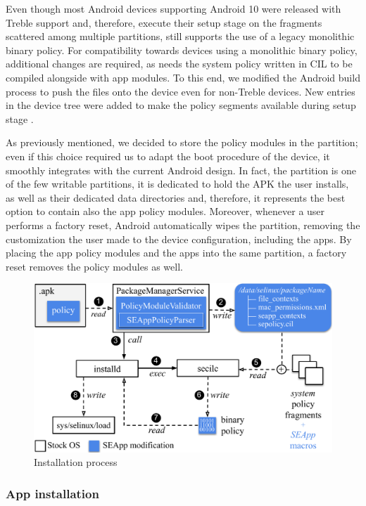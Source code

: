 Even though most Android devices supporting Android 10 were released
with Treble support and, therefore, execute their \sel setup stage on
the \sepolicy fragments scattered among multiple partitions, \init
still supports the use of a legacy monolithic binary policy.  For
compatibility towards devices using a monolithic binary policy,
additional changes are required, as \pap needs the system policy
written in CIL to be compiled alongside with app modules.  To this
end, we modified the Android build process to push the \sepolicy files
onto the device even for non-Treble devices.  New entries in the
device tree were added to make the policy segments available during
\init \sel setup stage \cite{seapp_early}.

As previously mentioned, we decided to store the policy modules in the
\data partition; even if this choice required us to adapt the boot
procedure of the device, it smoothly integrates \pap with the current
Android design.  In fact, the \data partition is one of the few
writable partitions, it is dedicated to hold the APK the user
installs, as well as their dedicated data directories and, therefore,
it represents the best option to contain also the app policy modules.
Moreover, whenever a user performs a factory reset, Android
automatically wipes the \data partition, removing the customization
the user made to the device configuration, including the apps.  By
placing the app policy modules and the apps into the same partition, a
factory reset removes the policy modules as well.

\begin{figure}[h]
	\begin{center}
		\includegraphics[width=0.8\columnwidth]{chapters/seapp/figs/app_installation}
	\end{center}
	\caption{\label{fig:seapp_install} Installation process}
\end{figure}

\subsubsection{App installation}

